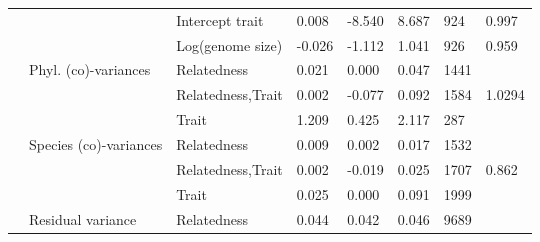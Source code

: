 \begin{longtable}[t]{llllllll}
\hspace{1em} &  & Intercept trait & 0.008 & -8.540 & 8.687 & 924 & 0.997\\
\hspace{1em} &  & Log(genome size) & -0.026 & -1.112 & 1.041 & 926 & 0.959\\
\hspace{1em} & Phyl. (co)-variances & Relatedness & 0.021 & 0.000 & 0.047 & 1441 & \\
\hspace{1em} &  & Relatedness,Trait & 0.002 & -0.077 & 0.092 & 1584 & 1.0294\\
\hspace{1em} &  & Trait & 1.209 & 0.425 & 2.117 & 287 & \\
\hspace{1em} & Species (co)-variances & Relatedness & 0.009 & 0.002 & 0.017 & 1532 & \\
\hspace{1em} &  & Relatedness,Trait & 0.002 & -0.019 & 0.025 & 1707 & 0.862\\
\hspace{1em} &  & Trait & 0.025 & 0.000 & 0.091 & 1999 & \\
\hspace{1em} & Residual variance & Relatedness & 0.044 & 0.042 & 0.046 & 9689 & \\*
\end{longtable}
